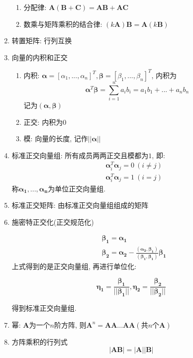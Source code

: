 \begin{enumerate}
\begin{enumerate}
\item 分配律: $ \bm{A}(\bm{B}+\bm{C})=\bm{A}\bm{B}+\bm{A}\bm{C} $
\item 数乘与矩阵乘积的结合律: $ (k\bm{A})\bm{B}=\bm{A}(k\bm{B}) $
\end{enumerate}
\item 转置矩阵: 行列互换
\item 向量的内积和正交
\begin{enumerate}
\item 内积: $ \bm{\alpha} = [\alpha_{1},...,\alpha_{n}]^{T}, \bm{\beta} = [\beta_{1},...,\beta_{n}]^{T} $, 内积为
\begin{equation*}
\bm{\alpha}^{T}\bm{\beta}=\sum_{i=1}^{n}a_{i}b_{i}=a_{1}b_{1}+...+a_{n}b_{n}
\end{equation*}
记为$ (\bm{\alpha},\bm{\beta}) $
\item 正交: 内积为$ 0 $
\item 模: 向量的长度, 记作$ ||\bm{\alpha}|| $
\end{enumerate}
\item 标准正交向量组: 所有成员两两正交且模都为$ 1 $, 即:
\begin{equation*}
\begin{aligned}
&\bm{\alpha}_{i}^{T}\bm{\alpha}_{j}=0\ (i\neq j)\\&\bm{\alpha}_{i}^{T}\bm{\alpha}_{j}=1\ (i=j)
\end{aligned}
\end{equation*}
称$ \bm{\alpha_{1}},...,\bm{\alpha_{n}} $为单位正交向量组.
\item 标准正交矩阵: 由标准正交向量组组成的矩阵
\item 施密特正交化(正交规范化)\par
\begin{equation*}
\begin{aligned}
&\bm{\beta_{1}}=\bm{\alpha_{1}}\\&\bm{\beta_{2}}=\bm{\alpha_{2}}-\frac{(\bm{\alpha_{2}},\bm{\beta_{1}})}{(\bm{\beta_{1}},\bm{\beta_{1}})}\bm{\beta_{1}}
\end{aligned}
\end{equation*}
上式得到的是正交向量组, 再进行单位化:\par
\begin{equation*}
\bm{\eta_{1}}=\frac{\bm{\beta_{1}}}{||\bm{\beta_{1}}||}, \bm{\eta_{2}}=\frac{\bm{\beta_{2}}}{||\bm{\beta_{2}}||}
\end{equation*}\par
得到标准正交向量组.
\item 幂: $ \bm{A} $为一个$ n $阶方阵, 则$ \bm{A}^{n}=\bm{A}\bm{A}...\bm{A}\bm{A}(\text{共}n\text{个}\bm{A}) $
\item 方阵乘积的行列式
\begin{equation*}
|\bm{A}\bm{B}|=|\bm{A}||\bm{B}|
\end{equation*}
\end{enumerate}
